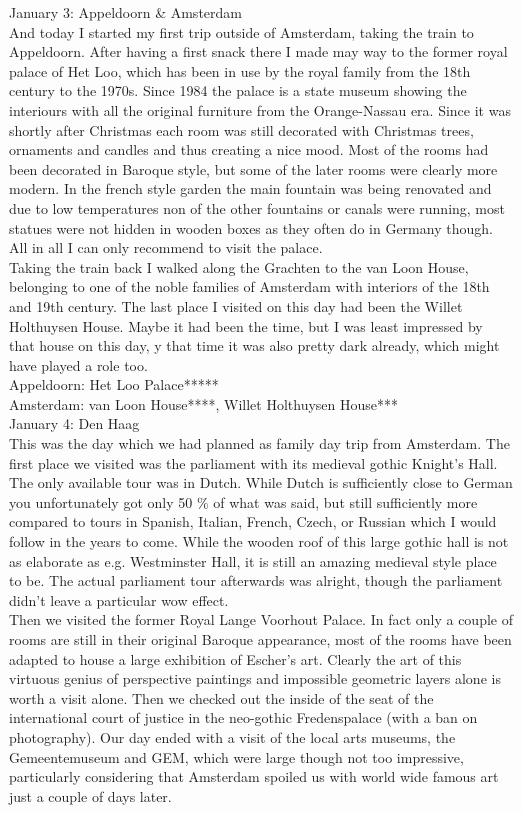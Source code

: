 January 3: Appeldoorn \& Amsterdam\\
And today I started my first trip outside of Amsterdam, taking the train to Appeldoorn. After having a first snack there I made may way to the former royal palace of Het Loo, which has been in use by the royal family from the 18th century to the 1970s. Since 1984 the palace is a state museum showing the interiours with all the original furniture from the Orange-Nassau era. Since it was shortly after Christmas each room was still decorated with Christmas trees, ornaments and candles and thus creating a nice mood. Most of the rooms had been decorated in Baroque style, but some of the later rooms were clearly more modern. In the french style garden the main fountain was being renovated and due to low temperatures non of the other fountains or canals were running, most statues were not hidden in wooden boxes as they often do in Germany though. All in all I can only recommend to visit the palace. \\
Taking the train back I walked along the Grachten to the van Loon House, belonging to one of the noble families of Amsterdam with interiors of the 18th and 19th century. The last place I visited on this day had been the Willet Holthuysen House. Maybe it had been the time, but I was least impressed by that house on this day, y that time it was also pretty dark already, which might have played a role too.\\

Appeldoorn: Het Loo Palace*****\\
Amsterdam: van Loon House****, Willet Holthuysen House***\\

January 4: Den Haag\\
This was the day which we had planned as family day trip from Amsterdam. The first place we visited was the parliament with its medieval gothic Knight's Hall. The only available tour was in Dutch. While Dutch is sufficiently close to German you unfortunately got only 50 \% of what was said, but still sufficiently more compared to tours in Spanish, Italian, French, Czech, or Russian which I would follow in the years to come. While the wooden roof of this large gothic hall is not as elaborate as e.g. Westminster Hall, it is still an amazing medieval style place to be. The actual parliament tour afterwards was alright, though the parliament didn't leave a particular wow effect.\\
Then we visited the former Royal Lange Voorhout Palace. In fact only a couple of rooms are still in their original Baroque appearance, most of the rooms have been adapted to house a large exhibition of Escher's art. Clearly the art of this virtuous genius of perspective paintings and impossible geometric layers alone is worth a visit alone. Then we checked out the inside of the seat of the international court of justice in the neo-gothic Fredenspalace (with a ban on photography). Our day ended with a visit of the local arts museums, the Gemeentemuseum and GEM, which were large though not too impressive, particularly considering that Amsterdam spoiled us with world wide famous art just a couple of days later.\\

